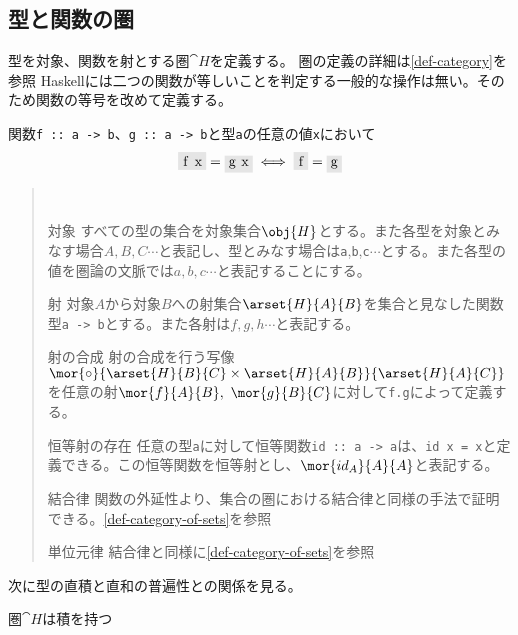 \documentclass[uplatex,dvipdfmx]{jsarticle}
\newcommand{\pr}[1]{\colorbox[rgb]{0.9,0.9,0.9}{\lstinline{#1}}}
\newcommand{\functype}[2]{\pr{#1 -> #2}}
\newcommand{\refcti}[1]{\cite{cti}\ref{#1}}
\newcommand{\fpmor}[3]{\pr{#1 :: #2 -> #3}}
\begin{document}
  \subsection{型と関数の圏}
  型を対象、関数を射とする圏$\cat{H}$を定義する。
  圏の定義の詳細は\refcti{def-category}を参照
  Haskellには二つの関数が等しいことを判定する一般的な操作は無い。そのため関数の等号を改めて定義する。
  \begin{define}[関数の外延性]\label{def-function-extensionality}
    関数\fpmor{f}{a}{b}、\fpmor{g}{a}{b}と型\pr{a}の任意の値\pr{x}において\[\pr{f x}=\pr{g x} \iff \pr{f} = \pr{g}\]
  \end{define}
  \begin{define}[型と関数の圏]\label{def-hask-category}
		\begin{quote}~
			\begin{mydescription}
        \item[対象] すべての型の集合を対象集合$\obj{H}$とする。また各型を対象とみなす場合$A,B,C\cdots$と表記し、型とみなす場合は\pr{a},\pr{b},\pr{c}$\cdots$とする。また各型の値を圏論の文脈では$a,b,c\cdots$と表記することにする。
        \item[射] 対象$A$から対象$B$への射集合$\arset{H}{A}{B}$を集合と見なした関数型\functype{a}{b}とする。また各射は$f,g,h\cdots$と表記する。
        \item[射の合成] 射の合成を行う写像$\mor{\circ}{\arset{H}{B}{C}\times\arset{H}{A}{B}}{\arset{H}{A}{C}}$を任意の射$\mor{f}{A}{B},\ \mor{g}{B}{C}$に対して\pr{f.g}によって定義する。
        \item[恒等射の存在] 任意の型\pr{a}に対して恒等関数\fpmor{id}{a}{a}は、\pr{id x = x}と定義できる。この恒等関数を恒等射とし、$\mor{id_A}{A}{A}$と表記する。
        \item[結合律] 関数の外延性より、集合の圏における結合律と同様の手法で証明できる。\refcti{def-category-of-sets}を参照
        \item[単位元律]結合律と同様に\refcti{def-category-of-sets}を参照
		  \end{mydescription}
		\end{quote}
	\end{define}
  次に型の直積と直和の普遍性との関係を見る。
  \begin{prop}[$\cat{H}$の積]\label{prop-h-has-product}
    圏$\cat{H}$は積を持つ
  \end{prop}
\end{document}
